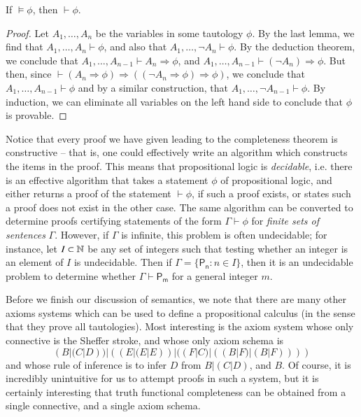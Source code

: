 \begin{corollary}
    If $\vDash \phi$, then $\vdash \phi$.
\end{corollary}
\begin{proof}
    Let $A_1, \dots, A_n$ be the variables in some tautology $\phi$. By the last lemma, we find that $A_1, \dots, A_n \vdash \phi$, and also that $A_1, \dots, \neg A_n \vdash \phi$. By the deduction theorem, we conclude that $A_1, \dots, A_{n-1} \vdash A_n \Rightarrow \phi$, and $A_1, \dots, A_{n-1} \vdash (\neg A_n) \Rightarrow \phi$. But then, since $\vdash (A_n \Rightarrow \phi) \Rightarrow ((\neg A_n \Rightarrow \phi) \Rightarrow \phi)$, we conclude that $A_1, \dots, A_{n-1} \vdash \phi$ and by a similar construction, that $A_1, \dots, \neg A_{n-1} \vdash \phi$. By induction, we can eliminate all variables on the left hand side to conclude that $\phi$ is provable.
\end{proof}

Notice that every proof we have given leading to the completeness theorem is constructive -- that is, one could effectively write an algorithm which constructs the items in the proof. This means that propositional logic is {\it decidable}, i.e. there is an effective algorithm that takes a statement $\phi$ of propositional logic, and either returns a proof of the statement $\vdash \phi$, if such a proof exists, or states such a proof does not exist in the other case. The same algorithm can be converted to determine proofs certifying statements of the form $\Gamma \vdash \phi$ for \emph{finite sets of sentences} $\Gamma$. However, if $\Gamma$ is infinite, this problem is often undecidable; for instance, let $I \subset \operatorname{\mathbb{N}}$ be any set of integers such that testing whether an integer is an element of $I$ is undecidable. Then if $\Gamma = \{ \mathsf{P_n} : n \in I \}$, then it is an undecidable problem to determine whether $\Gamma \vdash \mathsf{P_m}$ for a general integer $m$.

Before we finish our discussion of semantics, we note that there are many other axioms systems which can be used to define a propositional calculus (in the sense that they prove all tautologies). Most interesting is the axiom system whose only connective is the Sheffer stroke, and whose only axiom schema is
%
\[ (B|(C|D))|((E|(E|E))|((F|C)|((B|F)|(B|F)))) \]
%
and whose rule of inference is to infer $D$ from $B|(C|D)$, and $B$. Of course, it is incredibly unintuitive for us to attempt proofs in such a system, but it is certainly interesting that truth functional completeness can be obtained from a single connective, and a single axiom schema.

